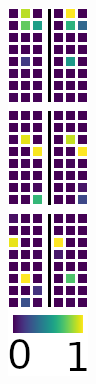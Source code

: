 \begin{figure}
\begin{subfigure}[c]{.045\linewidth}
        \caption{}
    \end{subfigure}
        \hfill
    \begin{subfigure}[c]{.0295\linewidth}
        \includegraphics[width=\linewidth]{figures/SCA/mnist/acts}

\end{subfigure}
\end{figure}
